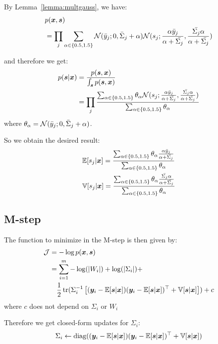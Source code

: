 By Lemma~\ref{lemma:multgauss}, we have:
\begin{align}
  &p(\boldsymbol{x}, \boldsymbol{s}) \\
  &= \prod_j \sum_{\alpha \in \{0.5, 1.5\}} \mathcal{N}(\bar{y}_{j}; 0 , \bar{\Sigma}_{j} + \alpha) \mathcal{N}(s_j; \frac{\alpha \bar{y}_{j}}{\alpha + \bar{\Sigma_{j}}}, \frac{\bar{\Sigma_{j}}\alpha}{\alpha + \bar{\Sigma_{j}}})
\end{align}

and therefore we get:
\begin{align}
  p(\boldsymbol{s} | \boldsymbol{x}) &= \frac{p(\boldsymbol{s}, \boldsymbol{x})}{\int_{\boldsymbol{s}} p(\boldsymbol{s}, \boldsymbol{x})} \\
                &= \prod_j \frac{\sum_{\alpha \in \{0.5, 1.5\}} \theta_{\alpha} \mathcal{N}(s_j; \frac{\alpha \bar{y}_{j}}{\alpha + \bar{\Sigma_{j}}}, \frac{\bar{\Sigma_{j}}\alpha}{\alpha + \bar{\Sigma_{j}}})}{\sum_{\alpha \in \{0.5, 1.5\}} \theta_{\alpha}}
\end{align}
where $\theta_{\alpha} = \mathcal{N}(\bar{y}_{j}; 0 , \bar{\Sigma}_{j} + \alpha)$.

So we obtain the desired result:
\begin{align}
  &\mathbb{E}[s_j | \boldsymbol{x}] = \frac{\sum_{\alpha \in \{0.5, 1.5\}} \theta_{\alpha} \frac{\alpha \bar{y}_{j}}{\alpha + \bar{\Sigma_{j}}}}{\sum_{\alpha \in \{0.5, 1.5\}} \theta_{\alpha}} \\
  & \mathbb{V}[s_j | \boldsymbol{x}] = \frac{\sum_{\alpha \in \{0.5, 1.5\}} \theta_{\alpha} \frac{\bar{\Sigma_{j}}\alpha}{\alpha + \bar{\Sigma_{j}}}}{\sum_{\alpha \in \{0.5, 1.5\}} \theta_{\alpha}}  
\end{align}

\subsection{M-step}
The function to minimize in the M-step is then given by:
\begin{align}
  \mathcal{J} &= -\log p(\boldsymbol{x}, \boldsymbol{s}) \\
  &= \sum_{i=1}^m - \log(|W_i|) + \log(|\Sigma_i|) + \\& \enspace \enspace \frac12 \mathop{\mathrm{tr}}(\Sigma_i^{-1} \left[(\boldsymbol{y}_i - \mathbb{E}[\boldsymbol{s} | \boldsymbol{x}]) (\boldsymbol{y}_i - \mathbb{E}[\boldsymbol{s} | \boldsymbol{x}])^{\top}+ \mathbb{V}[\boldsymbol{s} | \boldsymbol{x}]\right]) + c
\end{align}
where $c$ does not depend on $\Sigma_i$ or $W_i$

Therefore we get closed-form updates for $\Sigma_i$: 
\begin{align}
\Sigma_i \leftarrow  \operatorname*{diag}((\boldsymbol{y}_i - \mathbb{E}[\boldsymbol{s} | \boldsymbol{x}]) (\boldsymbol{y}_i - \mathbb{E}[\boldsymbol{s} | \boldsymbol{x}])^{\top}+ \mathbb{V}[\boldsymbol{s} | \boldsymbol{x}])
\end{align}

